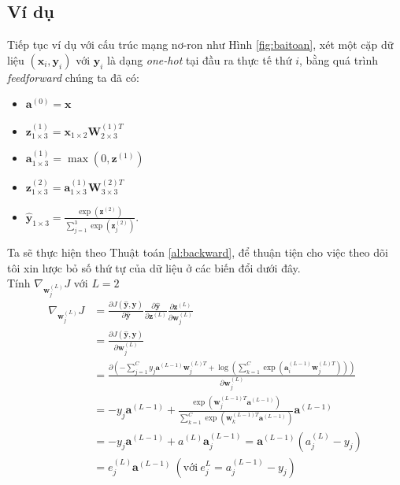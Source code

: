 \subsection{Ví dụ}
Tiếp tục ví dụ với cấu trúc mạng nơ-ron như Hình \ref{fig:baitoan}, xét một cặp dữ liệu $(\textbf{x}_i,\textbf{y}_i)$ với $\textbf{y}_i$ là dạng \textit{one-hot} tại đầu ra thực tế thứ $i$, bằng quá trình \textit{feedforward }chúng ta đã có: 


\begin{itemize}
	\item[] $\textbf{a}^{(0)}=\textbf{x}$
	\item[]  $\textbf{z}^{(1)}_{1 \times 3}=\textbf{x}_{1\times 2}\textbf{W}^{(1)T}_{2{\times}3}$
	\item[] $\textbf{a}^{(1)}_{1 \times 3}=\max(0,\textbf{z}^{(1)})$
	
	\item[] $\textbf{z}^{(2)}_{1\times 3}=\textbf{a}^{(1)}_{1 \times 3}\textbf{W}^{(2)T}_{3{{\times}}3 }$
	
	\item[] $\widehat{\textbf{y}}_{1\times 3} = \frac{\exp({\textbf{z}^{(2)}})}{\sum^{3}_{j=1}{\exp({\textbf{z}^{(2)}_j})}}$.

\end{itemize}
Ta sẽ thực hiện theo Thuật toán \ref{al:backward}, để thuận tiện cho việc theo dõi tôi xin lược bỏ số thứ tự của dữ liệu ở các biến đổi dưới đây.\\
Tính $\nabla_{\textbf{w}^{(L)}_j}J $ với $L=2$
\begin{equation}
\begin{split}
\nabla_{\textbf{w}^{(L)}_j}J  &= \frac{\partial J(\widehat{\textbf{y}},\textbf{y}) }{\partial \widehat{\textbf{y}}} \frac{\partial  \widehat{\textbf{y}}}{\partial \textbf{z}^{(L)}} \frac{\partial \textbf{z}^{(L)}}{\partial \textbf{w}^{(L)}_j}\\
&= \frac{\partial J(\widehat{\textbf{y}},\textbf{y}) }{\partial \textbf{w}^{(L)}_j}\\
&=\frac{\partial \left( -\sum_{j=1}^C y_{j} \textbf{a}^{(L-1)}\textbf{w}^{(L)T}_{j} + \log\left(\sum_{k=1}^C \exp(\textbf{a}^{(L-1)}_i\textbf{w}^{(L)T}_{j})\right) \right)}{\partial \textbf{w}^{(L)}_j}\\
&=-y_{j}\textbf{a}^{(L-1)} + 
\frac{\exp(\textbf{w}_j^{(L-1)T}\textbf{a}^{(L-1)})}{\sum_{k = 1}^C \exp(\textbf{w}_k^{(L-1)T}\textbf{a}^{(L-1)})}\textbf{a}^{(L-1)} \\
&= -y_{j}\textbf{a}^{(L-1)} + a^{(L)} \textbf{a}^{(L-1)}_{j}= \textbf{a}^{(L-1)} (a^{(L)}_{j} - y_{j}) \\
&= e^{(L)}_{j}\textbf{a}^{(L-1)} ~(\text{với}~ e^{L}_{j} = a^{(L-1)}_{j} - y_{j})
\end{split}
\end{equation} 

